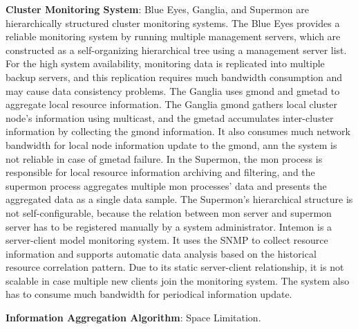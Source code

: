 \documentclass{acm_proc_article-sp}
\begin{document}
\textbf{Cluster Monitoring System}: Blue Eyes\cite{blueeyes}, Ganglia\cite{ganglia}, and Supermon\cite{supermon} are hierarchically structured cluster monitoring systems. 
The Blue Eyes\cite{blueeyes} provides a reliable monitoring system by running multiple management servers, which are constructed as a self-organizing hierarchical tree using a management server list. 
For the high system availability, monitoring data is replicated into multiple backup servers, and this replication requires much bandwidth consumption and may cause data consistency problems.
The Ganglia\cite{ganglia} uses gmond and gmetad to aggregate local resource information. 
The Ganglia gmond gathers local cluster node's information using multicast, and the gmetad accumulates inter-cluster information by collecting the gmond information.
It also consumes much network bandwidth for local node information update to the gmond, ann the system is not reliable in case of gmetad failure.
In the Supermon\cite{supermon}, the mon process is responsible for local resource information archiving and filtering, 
and the supermon process aggregates multiple mon processes' data and presents the aggregated data as a single data sample. 
The Supermon's hierarchical structure is not self-configurable, because the relation between mon server and supermon server has to be registered manually by a system administrator.
Intemon\cite{intemon} is a server-client model monitoring system. It uses the SNMP to collect resource information and supports automatic data analysis based on the historical resource correlation pattern.
Due to its static server-client relationship, it is not scalable in case multiple new clients join the monitoring system. The system also has to consume much bandwidth for periodical information update.

\textbf{Information Aggregation Algorithm}: 
Space Limitation. 
\end{document}
